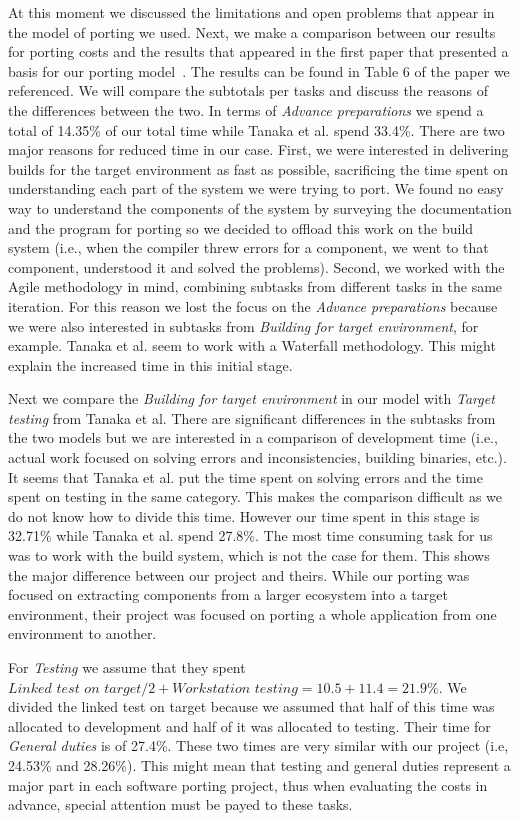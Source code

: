 At this moment we discussed the limitations and open problems that appear in the
model of porting we used. Next, we make a comparison between our results for
porting costs and the results that appeared in the first paper that presented a
basis for our porting model~\cite{tanaka}. The results can be found in Table 6 of
the paper we referenced. We will compare the subtotals per tasks and discuss the
reasons of the differences between the two. In terms of \textit{Advance
preparations} we spend a total of 14.35\% of our total time while Tanaka et al.
spend 33.4\%. There are two major reasons for reduced time in our case. First,
we were interested in delivering builds for the target environment as fast as
possible, sacrificing the time spent on understanding each part of the system we
were trying to port. We found no easy way to understand the components of the
system by surveying the documentation and the program for porting so we decided
to offload this work on the build system (i.e., when the compiler threw errors
for a component, we went to that component, understood it and solved the
problems). Second, we worked with the Agile methodology in mind, combining
subtasks from different tasks in the same iteration. For this reason we
lost the focus on the \textit{Advance preparations} because we were also
interested in subtasks from \textit{Building for target environment}, for
example. Tanaka et al. seem to work with a Waterfall methodology. This might
explain the increased time in this initial stage.

Next we compare the \textit{Building for target environment} in our model with
\textit{Target testing} from Tanaka et al. There are significant differences in
the subtasks from the two models but we are interested in a comparison of
development time (i.e., actual work focused on solving errors and
inconsistencies, building binaries, etc.). It seems that Tanaka et al. put the
time spent on solving errors and the time spent on testing in the same category.
This makes the comparison difficult as we do not know how to divide this time.
However our time spent in this stage is 32.71\% while Tanaka et al. spend
27.8\%. The most time consuming task for us was to work with the build system,
which is not the case for them. This shows the major difference between our
project and theirs. While our porting was focused on extracting components from
a larger ecosystem into a target environment, their project was focused on
porting a whole application from one environment to another.

For \textit{Testing} we assume that they spent $\textit{Linked test on target} /
2 + \textit{Workstation testing} = 10.5 + 11.4 = 21.9\%$. We divided the linked
test on target because we assumed that half of this time was allocated to
development and half of it was allocated to testing. Their time for
\textit{General duties} is of 27.4\%. These two times are very similar with our
project (i.e, 24.53\% and 28.26\%). This might mean that testing and general
duties represent a major part in each software porting project, thus when
evaluating the costs in advance, special attention must be payed to these tasks.

